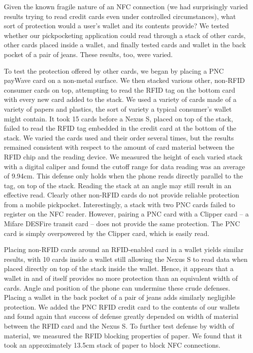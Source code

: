\documentclass{IEEEtran}
\begin{document}
Given the known fragile nature of an NFC connection (we had surprisingly varied results trying to read credit cards even under controlled circumstances), what sort of protection would a user's wallet and its contents provide?  We tested whether our pickpocketing application could read through a stack of other cards, other cards placed inside a wallet, and finally tested cards and wallet in the back pocket of a pair of jeans.  These results, too, were varied.

To test the protection offered by other cards, we began by placing a PNC payWave card on a non-metal surface.  We then stacked various other, non-RFID consumer cards on top, attempting to read the RFID tag on the bottom card with every new card added to the stack.  We used a variety of cards made of a variety of papers and plastics, the sort of variety a typical consumer's wallet might contain.  It took 15 cards before a Nexus S, placed on top of the stack, failed to read the RFID tag embedded in the credit card at the bottom of the stack.  We varied the cards used and their order several times, but the results remained consistent with respect to the amount of card material between the RFID chip and the reading device.  We measured the height of each varied stack with a digital caliper and found the cutoff range for data reading was an average of 9.94cm.  This defense only holds when the phone reads directly parallel to the tag, on top of the stack.  Reading the stack at an angle may still result in an effective read.  Clearly other non-RFID cards do not provide reliable protection from a mobile pickpocket.  Interestingly, a stack with two PNC cards failed to register on the NFC reader.  However, pairing a PNC card with a Clipper card -- a Mifare DESFire transit card -- does not provide the same protection.  The PNC card is simply overpowered by the Clipper card, which is easily read.

Placing non-RFID cards around an RFID-enabled card in a wallet yields similar results, with 10 cards inside a wallet still allowing the Nexus S to read data when placed directly on top of the stack inside the wallet.  Hence, it appears that a wallet in and of itself provides no more protection than an equivalent width of cards. Angle and position of the phone can undermine these crude defenses. Placing a wallet in the back pocket of a pair of jeans adds similarly negligible protection. We added the PNC RFID credit card to the contents of our wallets and found again that success of defense greatly depended on width of material between the RFID card and the Nexus S.  To further test defense by width of material, we measured the RFID blocking properties of paper.  We found that it took an approximately 13.5cm stack of paper to block NFC connections.
\end{document}
